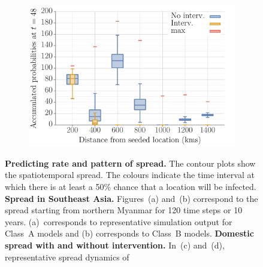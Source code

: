 \documentclass[11pt]{article}
\theoremstyle{definition}
\begin{document}
\begin{figure}[ht]
\begin{subfigure}[b]{.3\textwidth}
    \includegraphics[width=\textwidth]{../../cellular_automata/results/dist_inf_plots/TH_dist_prob_B_box.pdf}
\caption{\label{fig:thlBContourBox}} %
\end{subfigure}
\caption{\textbf{Predicting rate and pattern of spread.}
The contour plots show the spatiotemporal spread. The colours indicate the
time interval at which there is at least a 50\% chance that a location will
be infected. {\bf Spread in Southeast Asia.} Figures~(a) and~(b) correspond
to the spread starting from northern Myanmar for 120 time steps or 10
years.  (a)~corresponds to representative simulation output for Class~A
models and (b) corresponds to Class~B models. {\bf Domestic spread with and
without intervention.} In~(c) and~(d), representative spread dynamics of
}
\end{figure}
\end{document}
